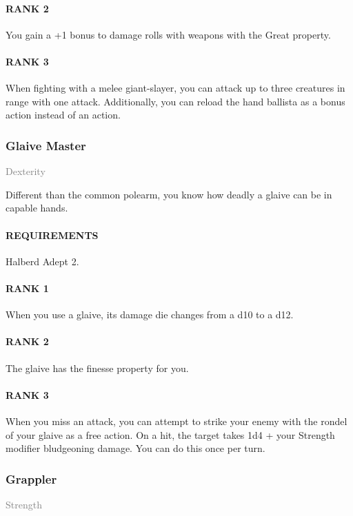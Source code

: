 \paragraph{RANK 2} You gain a +1 bonus to damage rolls with weapons with the Great property.
\paragraph{RANK 3} When fighting with a melee giant-slayer, you can attack up to three creatures in range with one attack.
Additionally, you can reload the hand ballista as a bonus action instead of an action.

\subsubsection{Glaive Master} \label{feat::glaivemaster}
\small{\textcolor{gray}{Dexterity}}

\normalsize
Different than the common polearm, you know how deadly a glaive can be in capable hands.
\paragraph{REQUIREMENTS} Halberd Adept 2.
\paragraph{RANK 1} When you use a glaive, its damage die changes from a d10 to a d12.
\paragraph{RANK 2} The glaive has the finesse property for you.
\paragraph{RANK 3} When you miss an attack, you can attempt to strike your enemy with the rondel of your glaive as a free action.
On a hit, the target takes 1d4 + your Strength modifier bludgeoning damage.
You can do this once per turn.

\subsubsection{Grappler} \label{feat::grappler}
\small{\textcolor{gray}{Strength}}

